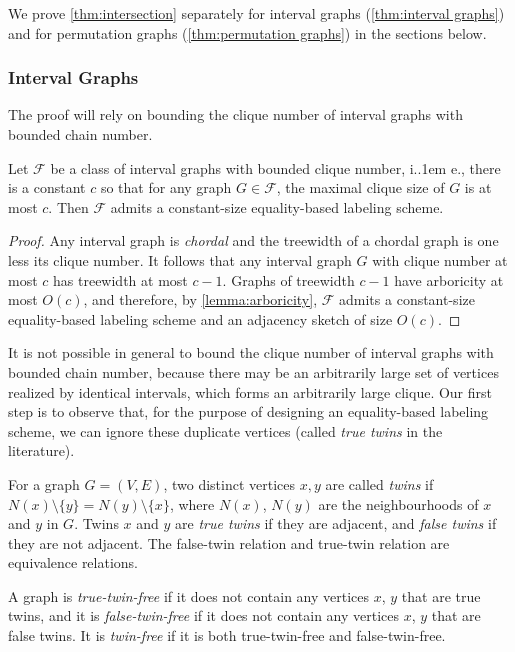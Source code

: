 \documentclass{theoretics}
\makeatletter
\newcommand{\cF}{\ensuremath{\mathcal{F}}}
\newcommand*\ie{i.\kern.1em e.\@\xspace} %
\makeatother
\begin{document}
We prove \cref{thm:intersection} separately for interval graphs (\cref{thm:interval graphs})
and for permutation graphs (\cref{thm:permutation graphs}) in the sections below.

\subsubsection{Interval Graphs}

The proof will rely on bounding the clique number of interval graphs with bounded chain number.

\begin{lemma}
\label{lem:bounded-clique-number-implies-RL-const}
Let $\cF$ be a class of interval graphs with bounded clique number, \ie, there is a
constant $c$ so that for any graph $G\in\cF$, the maximal clique size of $G$ is at most $c$.  Then $\cF$
admits a constant-size equality-based labeling scheme.
\end{lemma}
\begin{proof}
Any interval graph is \emph{chordal} and the treewidth of a chordal graph is one less its clique
number.  It follows that any interval graph $G$ with clique number at most $c$ has treewidth at most
$c-1$.  Graphs of treewidth $c-1$ have arboricity at most $O(c)$, and therefore, by
\cref{lemma:arboricity}, $\cF$ admits a constant-size equality-based labeling scheme and an
adjacency sketch of size $O(c)$.
\end{proof}

It is not possible in general to bound the clique number of interval graphs with bounded chain
number, because there may be an arbitrarily large set of vertices realized by identical intervals,
which forms an arbitrarily large clique. Our first step is to observe that, for the purpose of
designing an equality-based labeling scheme, we can ignore these duplicate vertices (called
\emph{true twins} in the literature).

\begin{definition}
For a graph $G = (V,E)$, two distinct vertices $x,y$ are called \emph{twins} if $N(x) \setminus
\{y\} = N(y) \setminus \{x\}$, where $N(x)$, $N(y)$ are the neighbourhoods of $x$ and $y$ in $G$.
Twins $x$ and $y$ are \emph{true twins} if they are adjacent, and \emph{false twins} if they are not
adjacent. The false-twin relation and true-twin relation are equivalence relations.

A graph is \emph{true-twin-free} if it does not contain any vertices $x$, $y$ that are true twins, and
it is \emph{false-twin-free} if it does not contain any vertices $x$, $y$ that are false twins. It
is \emph{twin-free} if it is both true-twin-free and false-twin-free.
\end{definition}
\end{document}
